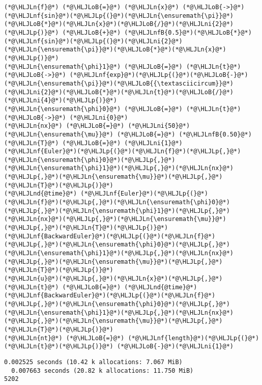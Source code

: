 \documentclass[12pt,a4paper]{article}
\newcommand{\HLJLn}[1]{#1}
\newcommand{\HLJLnd}[1]{\textcolor[RGB]{214,102,97}{#1}}
\newcommand{\HLJLnf}[1]{\textcolor[RGB]{66,102,213}{#1}}
\newcommand{\HLJLnfB}[1]{\textcolor[RGB]{59,151,46}{#1}}
\newcommand{\HLJLni}[1]{\textcolor[RGB]{59,151,46}{#1}}
\newcommand{\HLJLoB}[1]{\textcolor[RGB]{102,102,102}{\textbf{#1}}}
\newcommand{\HLJLp}[1]{#1}
\begin{document}
\begin{lstlisting}
(*@\HLJLn{f}@*) (*@\HLJLoB{=}@*) (*@\HLJLn{x}@*) (*@\HLJLoB{->}@*) (*@\HLJLnf{sin}@*)(*@\HLJLp{(}@*)(*@\HLJLn{\ensuremath{\pi}}@*)(*@\HLJLoB{*}@*)(*@\HLJLn{x}@*)(*@\HLJLoB{/}@*)(*@\HLJLni{2}@*)(*@\HLJLp{)}@*) (*@\HLJLoB{+}@*) (*@\HLJLnfB{0.5}@*)(*@\HLJLoB{*}@*)(*@\HLJLnf{sin}@*)(*@\HLJLp{(}@*)(*@\HLJLni{2}@*)(*@\HLJLn{\ensuremath{\pi}}@*)(*@\HLJLoB{*}@*)(*@\HLJLn{x}@*)(*@\HLJLp{)}@*)
(*@\HLJLn{\ensuremath{\phi}1}@*) (*@\HLJLoB{=}@*) (*@\HLJLn{t}@*) (*@\HLJLoB{->}@*) (*@\HLJLnf{exp}@*)(*@\HLJLp{(}@*)(*@\HLJLoB{-}@*)(*@\HLJLn{\ensuremath{\pi}}@*)(*@\HLJLoB{{\textasciicircum}}@*)(*@\HLJLni{2}@*)(*@\HLJLoB{*}@*)(*@\HLJLn{t}@*)(*@\HLJLoB{/}@*)(*@\HLJLni{4}@*)(*@\HLJLp{)}@*)
(*@\HLJLn{\ensuremath{\phi}0}@*) (*@\HLJLoB{=}@*) (*@\HLJLn{t}@*) (*@\HLJLoB{->}@*) (*@\HLJLni{0}@*)
(*@\HLJLn{nx}@*) (*@\HLJLoB{=}@*) (*@\HLJLni{50}@*)
(*@\HLJLn{\ensuremath{\mu}}@*) (*@\HLJLoB{=}@*) (*@\HLJLnfB{0.50}@*)
(*@\HLJLn{T}@*) (*@\HLJLoB{=}@*) (*@\HLJLni{1}@*)
(*@\HLJLnf{Euler}@*)(*@\HLJLp{(}@*)(*@\HLJLn{f}@*)(*@\HLJLp{,}@*)(*@\HLJLn{\ensuremath{\phi}0}@*)(*@\HLJLp{,}@*)(*@\HLJLn{\ensuremath{\phi}1}@*)(*@\HLJLp{,}@*)(*@\HLJLn{nx}@*)(*@\HLJLp{,}@*)(*@\HLJLn{\ensuremath{\mu}}@*)(*@\HLJLp{,}@*)(*@\HLJLn{T}@*)(*@\HLJLp{)}@*)
(*@\HLJLnd{@time}@*) (*@\HLJLnf{Euler}@*)(*@\HLJLp{(}@*)(*@\HLJLn{f}@*)(*@\HLJLp{,}@*)(*@\HLJLn{\ensuremath{\phi}0}@*)(*@\HLJLp{,}@*)(*@\HLJLn{\ensuremath{\phi}1}@*)(*@\HLJLp{,}@*)(*@\HLJLn{nx}@*)(*@\HLJLp{,}@*)(*@\HLJLn{\ensuremath{\mu}}@*)(*@\HLJLp{,}@*)(*@\HLJLn{T}@*)(*@\HLJLp{)}@*)
(*@\HLJLnf{BackwardEuler}@*)(*@\HLJLp{(}@*)(*@\HLJLn{f}@*)(*@\HLJLp{,}@*)(*@\HLJLn{\ensuremath{\phi}0}@*)(*@\HLJLp{,}@*)(*@\HLJLn{\ensuremath{\phi}1}@*)(*@\HLJLp{,}@*)(*@\HLJLn{nx}@*)(*@\HLJLp{,}@*)(*@\HLJLn{\ensuremath{\mu}}@*)(*@\HLJLp{,}@*)(*@\HLJLn{T}@*)(*@\HLJLp{)}@*)
(*@\HLJLn{u}@*)(*@\HLJLp{,}@*)(*@\HLJLn{x}@*)(*@\HLJLp{,}@*)(*@\HLJLn{t}@*) (*@\HLJLoB{=}@*) (*@\HLJLnd{@time}@*) (*@\HLJLnf{BackwardEuler}@*)(*@\HLJLp{(}@*)(*@\HLJLn{f}@*)(*@\HLJLp{,}@*)(*@\HLJLn{\ensuremath{\phi}0}@*)(*@\HLJLp{,}@*)(*@\HLJLn{\ensuremath{\phi}1}@*)(*@\HLJLp{,}@*)(*@\HLJLn{nx}@*)(*@\HLJLp{,}@*)(*@\HLJLn{\ensuremath{\mu}}@*)(*@\HLJLp{,}@*)(*@\HLJLn{T}@*)(*@\HLJLp{)}@*)
(*@\HLJLn{nt}@*) (*@\HLJLoB{=}@*) (*@\HLJLnf{length}@*)(*@\HLJLp{(}@*)(*@\HLJLn{t}@*)(*@\HLJLp{)}@*) (*@\HLJLoB{-}@*)(*@\HLJLni{1}@*)
\end{lstlisting}

\begin{lstlisting}
0.002525 seconds (10.42 k allocations: 7.067 MiB)
  0.007663 seconds (20.82 k allocations: 11.750 MiB)
5202
\end{lstlisting}
\end{document}
